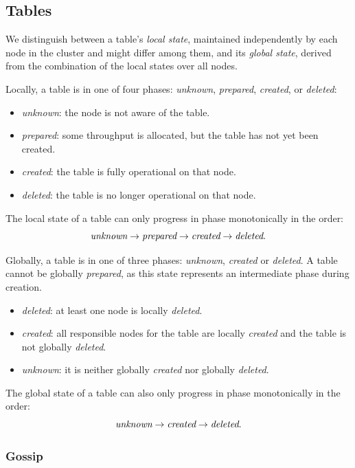 \subsection{Tables}
\label{subsec:impl-tables}

We distinguish between a table's \emph{local state}, maintained independently
by each node in the cluster and might differ among them, and its \emph{global
state}, derived from the combination of the local states over all nodes.

Locally, a table is in one of four phases: \emph{unknown}, \emph{prepared},
\emph{created}, or \emph{deleted}:
\begin{itemize}
    \item \emph{unknown}: the node is not aware of the table.
    \item \emph{prepared}: some throughput is allocated, but the table has not
        yet been created.
    \item \emph{created}: the table is fully operational on that node.
    \item \emph{deleted}: the table is no longer operational on that node.
\end{itemize}
The local state of a table can only progress in phase monotonically in the order:
\[
    \emph{unknown} \rightarrow \emph{prepared} \rightarrow \emph{created}
    \rightarrow \emph{deleted}.
\]

Globally, a table is in one of three phases: \emph{unknown}, \emph{created} or
\emph{deleted}.
A table cannot be globally \emph{prepared}, as this state represents an
intermediate phase during creation.
\begin{itemize}
    \item \emph{deleted}: at least one node is locally \emph{deleted}.
    \item \emph{created}: all responsible nodes for the table are locally
        \emph{created} and the table is not globally \emph{deleted}.
    \item \emph{unknown}: it is neither globally \emph{created} nor globally
        \emph{deleted}.
\end{itemize}
The global state of a table can also only progress in phase monotonically in the order:
\[
    \emph{unknown} \rightarrow \emph{created} \rightarrow \emph{deleted}.
\]

\subsubsection{Gossip}
\label{subsubsec:gossip}

